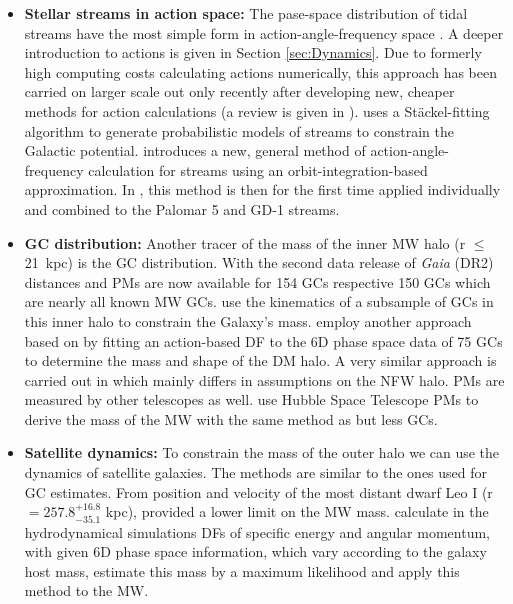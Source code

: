 \begin{itemize}
    \item \textbf{Stellar streams in action space:} The pase-space distribution of tidal streams have the most simple form in action-angle-frequency space \citep{Tremaine...streamsactiontheory...1999, Helmi...streamsactionstheory...1999}. A deeper introduction to actions is given in Section \ref{sec:Dynamics}. Due to formerly high computing costs calculating actions numerically, this approach has been carried on larger scale out only recently after developing new, cheaper methods for action calculations (a review is given in \citealp{Sanders...actionreview...2016}). \citet{Streams...Sanders...2014} uses a St\"ackel-fitting algorithm \citep{Sanders...Staeckel...2012} to generate probabilistic models of streams to constrain the Galactic potential. \citet{Streams...Bovy...2014} introduces a new, general method of action-angle-frequency calculation for streams using an orbit-integration-based approximation. In \citet{Streams..GD1..Pal5...Bovy...2016}, this method is then for the first time applied individually and combined to the Palomar 5 and GD-1 streams.
    \item \textbf{\ac{GC} distribution:} Another tracer of the mass of the inner \ac{MW} halo (r $\le$ \SI{21}{kpc}) is the \ac{GC} distribution. With the second data release of \textit{Gaia} (DR2) distances and \acp{PM} are now available for 154 \acp{GC} \citep{Baumgardt...GCoverview...2019} respective 150 \acp{GC} \citep{Vasiliev...GCoverview...2018} which are nearly all known \ac{MW} \acp{GC}. 
    \citet{MWmass...GCmotions...Watkins...2018} use the kinematics of a subsample of \acp{GC} in this inner halo to constrain the Galaxy's mass. \citet{Posti...MWmassGCs...2018} employ another approach based on \citet{Binney...MWGCModel....2017} by fitting an action-based \ac{DF} to the 6D phase space data of 75 \acp{GC} to determine the mass and shape of the \ac{DM} halo. A very similar approach is carried out in \citet{Vasiliev...GCoverview...2018} which mainly differs in assumptions on the \ac{NFW} halo. \acp{PM} are measured by other telescopes as well. \citet{Sohn...GCsHST..2018} use Hubble Space Telescope \acp{PM} to derive the mass of the \ac{MW} with the same method as \citet{MWmass...GCmotions...Watkins...2018} but less \acp{GC}. 

    \item \textbf{Satellite dynamics:} To constrain the mass of the outer halo we can use the dynamics of satellite galaxies. The methods are similar to the ones used for \ac{GC} estimates. From position and velocity of the most distant dwarf Leo I (r $= 257.8_{{-35.1}}^{+16.8} $ kpc), \citet{GaiaDR...GCs...2018} provided a lower limit on the \ac{MW} mass. \citet{MWmass...sat...dyn} calculate in the hydrodynamical simulations \acp{DF} of specific energy and angular momentum, with given 6D phase space information, which vary according to the galaxy host mass, estimate this mass by a maximum likelihood and apply this method to the \ac{MW}.
\end{itemize}

